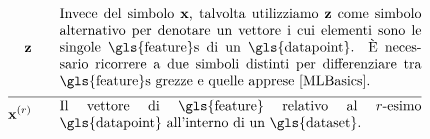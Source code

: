 \begin{align}
	\rawfeaturevec \quad\quad &\parbox{.75\textwidth}{Invece del simbolo $\featurevec$, talvolta utilizziamo $\rawfeaturevec$ come simbolo alternativo per denotare un vettore i cui elementi sono le singole \gls{feature}s di un \gls{datapoint}. È necessario ricorrere a due simboli distinti per differenziare tra \gls{feature}s grezze e quelle apprese \cite[Ch. 9]{MLBasics}.}\nonumber \\[2mm] \hline \nonumber\\[-5mm]
	\featurevec^{(\sampleidx)} \quad\quad &\parbox{.75\textwidth}{Il vettore di \gls{feature} relativo al $\sampleidx$-esimo \gls{datapoint} all'interno di un \gls{dataset}. } \nonumber %
\end{align}        



